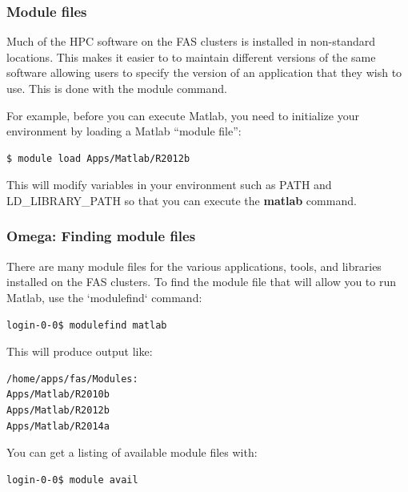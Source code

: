 \documentclass[10pt]{beamer}
\begin{document}
\begin{frame}[fragile]
\frametitle{Module files}
Much of the HPC software on the FAS clusters is installed in non-standard
locations. This makes it easier to to maintain different versions of the same
software allowing users to specify the version of an application that
they wish to use.  This is done with the module command.

\vskip10pt
For example, before you can execute Matlab, you need to initialize your
environment by loading a Matlab ``module file'':

\begin{verbatim}
$ module load Apps/Matlab/R2012b
\end{verbatim}

This will modify variables in your environment such as PATH and
LD\_LIBRARY\_PATH so that you can execute the \textbf{matlab} command.
\end{frame}

\begin{frame}[fragile]
\frametitle{Omega: Finding module files}
There are many module files for the various applications, tools, and
libraries installed on the FAS clusters.  To find the module file that
will allow you to run Matlab, use the `modulefind` command:

\begin{verbatim}
login-0-0$ modulefind matlab
\end{verbatim}

This will produce output like:

\begin{verbatim}
/home/apps/fas/Modules:
Apps/Matlab/R2010b
Apps/Matlab/R2012b
Apps/Matlab/R2014a
\end{verbatim}

You can get a listing of available module files with:
\begin{verbatim}
login-0-0$ module avail
\end{verbatim}
\end{frame}
\end{document}
